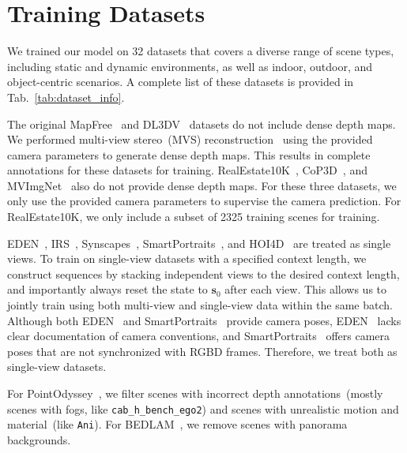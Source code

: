 












\section{Training Datasets}
We trained our model on 32 datasets that covers a diverse range of scene types, including static and dynamic environments, as well as indoor, outdoor, and object-centric scenarios. A complete list of these datasets is provided in Tab.~\ref{tab:dataset_info}. 



The original MapFree~\cite{arnold2022mapfree} and DL3DV~\cite{ling2024dl3dv} datasets do not include dense depth maps. We performed multi-view stereo~(MVS) reconstruction~\cite{schoenberger2016sfm} using the provided camera parameters to generate dense depth maps. This results in complete annotations for these datasets for training. RealEstate10K~\cite{realestate10k}, CoP3D~\cite{sinha2023cop3d}, and MVImgNet~\cite{yu2023mvimgnet} also do not provide dense depth maps. For these three datasets, we only use the provided camera parameters to supervise the camera prediction. For RealEstate10K, we only include a subset of 2325 training scenes for training.

EDEN~\cite{le2021eden}, IRS~\cite{wang2021irs}, Synscapes~\cite{wrenninge2018synscapes}, SmartPortraits~\cite{kornilova2022smartportraits}, and HOI4D~\cite{liu2022hoi4d} are treated as single views. To train on single-view datasets with a specified context length, we construct sequences by stacking independent views to the desired context length, and importantly always reset the state to $\bm{s}_0$ after each view. This allows us to jointly train using both multi-view and single-view data within the same batch. Although both EDEN~\cite{le2021eden} and SmartPortraits~\cite{kornilova2022smartportraits} provide camera poses,  EDEN~\cite{le2021eden} lacks clear documentation of camera conventions, and SmartPortraits~\cite{kornilova2022smartportraits} offers camera poses that are not synchronized with RGBD frames. Therefore, we treat both as single-view datasets.

For PointOdyssey~\cite{zheng2023pointodyssey}, we filter scenes with incorrect depth annotations~(mostly scenes with fogs, like \texttt{cab\_h\_bench\_ego2})
 and scenes with unrealistic motion and material~(like \texttt{Ani}). For BEDLAM~\cite{black2023bedlam}, we remove scenes with panorama backgrounds. 

